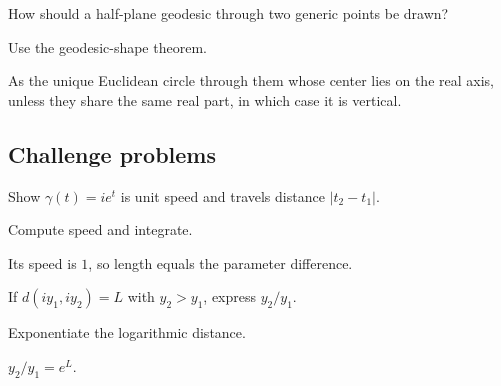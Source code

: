 \begin{exercise}\label{exr:vii32-ped-14}
How should a half-plane geodesic through two generic points be drawn?
\end{exercise}

\begin{hint}
Use the geodesic-shape theorem.
\end{hint}

\begin{solution}
As the unique Euclidean circle through them whose center lies on the real axis, unless they share the same real part, in which case it is vertical.
\end{solution}

\subsection*{Challenge problems}

\begin{exercise}\label{exr:vii32-ped-15}
Show \(\gamma(t)=ie^t\) is unit speed and travels distance \(|t_2-t_1|\).
\end{exercise}

\begin{hint}
Compute speed and integrate.
\end{hint}

\begin{solution}
Its speed is \(1\), so length equals the parameter difference.
\end{solution}

\begin{exercise}\label{exr:vii32-ped-16}
If \(d(iy_1,iy_2)=L\) with \(y_2>y_1\), express \(y_2/y_1\).
\end{exercise}

\begin{hint}
Exponentiate the logarithmic distance.
\end{hint}

\begin{solution}
\(y_2/y_1=e^L\).
\end{solution}

